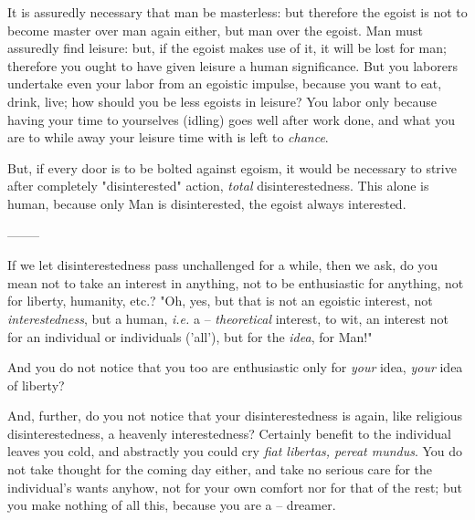 \documentclass[a4paper]{book}
\begin{document}
It is assuredly necessary that man be masterless: but therefore the egoist is 
not to become master over man again either, but man over the egoist. Man must 
assuredly find leisure: but, if the egoist makes use of it, it will be lost 
for man; therefore you ought to have given leisure a human significance. But 
you laborers undertake even your labor from an egoistic impulse, because you 
want to eat, drink, live; how should you be less egoists in leisure? You labor 
only because having your time to yourselves (idling) goes well after work 
done, and what you are to while away your leisure time with is left to 
\textit{chance}.

But, if every door is to be bolted against egoism, it would be necessary to 
strive after completely "{}disinterested"{} action, \textit{total} 
disinterestedness. This alone is human, because only Man is disinterested, the 
egoist always interested.

\begin{center}
--------\end{center}


If we let disinterestedness pass unchallenged for a while, then we ask, do you 
mean not to take an interest in anything, not to be enthusiastic for anything, 
not for liberty, humanity, etc.? "{}Oh, yes, but that is not an egoistic 
interest, not \textit{interestedness}, but a human, \textit{i.e.} a -- 
\textit{theoretical} interest, to wit, an interest not for an individual or 
individuals ('all'), but for the \textit{idea}, for Man!"{}

And you do not notice that you too are enthusiastic only for \textit{your} 
idea, \textit{your} idea of liberty?

And, further, do you not notice that your disinterestedness is again, like 
religious disinterestedness, a heavenly interestedness? Certainly benefit to 
the individual leaves you cold, and abstractly you could cry \textit{fiat 
libertas, pereat mundus}. You do not take thought for the coming day either, 
and take no serious care for the individual's wants anyhow, not for your own 
comfort nor for that of the rest; but you make nothing of all this, because 
you are a -- dreamer.
\end{document}
